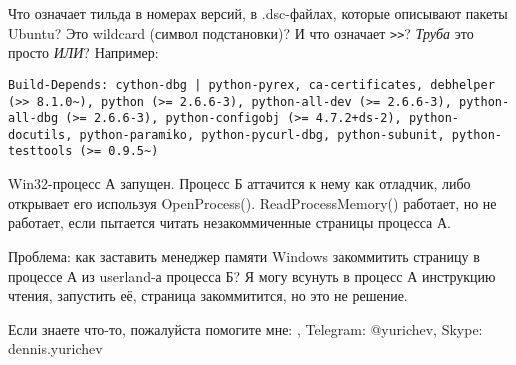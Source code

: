 \myhrule{}

Что означает тильда в номерах версий, в .dsc-файлах, которые описывают пакеты Ubuntu?
Это wildcard (символ подстановки)?
И что означает \verb|>>|?
\emph{Труба} это просто \emph{ИЛИ}?
Например:

\begin{lstlisting}
Build-Depends: cython-dbg | python-pyrex, ca-certificates, debhelper (>> 8.1.0~), python (>= 2.6.6-3), python-all-dev (>= 2.6.6-3), python-all-dbg (>= 2.6.6-3), python-configobj (>= 4.7.2+ds-2), python-docutils, python-paramiko, python-pycurl-dbg, python-subunit, python-testtools (>= 0.9.5~)
\end{lstlisting}

\myhrule{}

Win32-процесс А запущен.
Процесс Б аттачится к нему как отладчик, либо открывает его используя OpenProcess().
ReadProcessMemory() работает, но не работает, если пытается читать незакоммиченные страницы процесса А.

Проблема: как заставить менеджер памяти Windows закоммитить страницу в процессе А из userland-а процесса Б?
Я могу всунуть в процесс А инструкцию чтения, запустить её, страница закоммитится, но это не решение.

\myhrule{}

Если знаете что-то, пожалуйста помогите мне: \EMAIL{}, Telegram: @yurichev, Skype: dennis.yurichev
